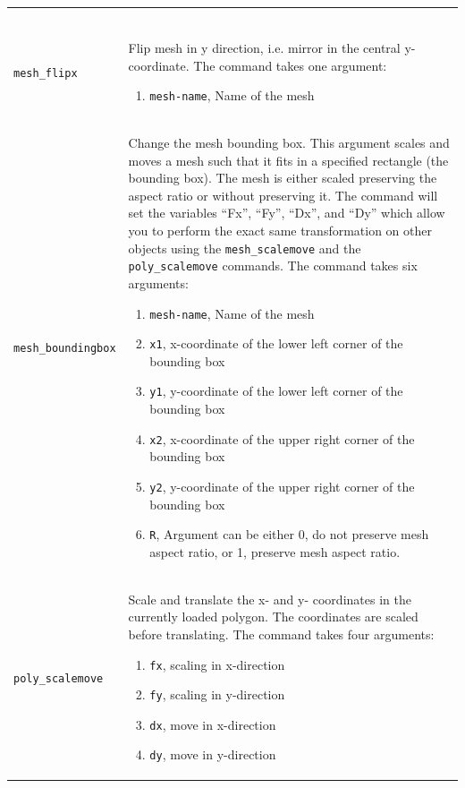 \documentclass[noshowpacs,preprintnumbers,amsmath,amssymb, letter]{revtex4}
\begin{document}
\begin{longtable}{p{}p{}}
\begin{enumerate}
\end{enumerate}\\
\texttt{mesh\_flipx} 	& Flip mesh in y direction, i.e. mirror in the central y-coordinate. The command takes one argument:
\begin{enumerate}
\item \texttt{mesh-name}, Name of the mesh
\end{enumerate}\\
\texttt{mesh\_boundingbox} 	& Change the mesh bounding box. This argument scales and moves a mesh such that it fits in a specified rectangle (the bounding box). The mesh is either scaled preserving the aspect ratio or without preserving it. The command will set the variables ``Fx'', ``Fy'', ``Dx'', and ``Dy'' which allow you to perform the exact same transformation on other objects using the \texttt{mesh\_scalemove} and the \texttt{poly\_scalemove} commands. The command takes six arguments:
\begin{enumerate}
\item \texttt{mesh-name}, Name of the mesh
\item \texttt{x1}, x-coordinate of the lower left corner of the bounding box
\item \texttt{y1}, y-coordinate of the lower left corner of the bounding box
\item \texttt{x2}, x-coordinate of the upper right corner of the bounding box
\item \texttt{y2}, y-coordinate of the upper right corner of the bounding box
\item \texttt{R}, Argument can be either 0, do not preserve mesh aspect ratio, or 1, preserve mesh aspect ratio. 
\end{enumerate}\\
\texttt{poly\_scalemove} 	& Scale and translate the x- and y- coordinates in the currently loaded polygon. The coordinates are scaled before translating. The command takes four arguments:
\begin{enumerate}
\item \texttt{fx}, scaling in x-direction
\item \texttt{fy}, scaling in y-direction
\item \texttt{dx}, move in x-direction
\item \texttt{dy}, move in y-direction

\end{enumerate}
\end{longtable}
\end{document}
